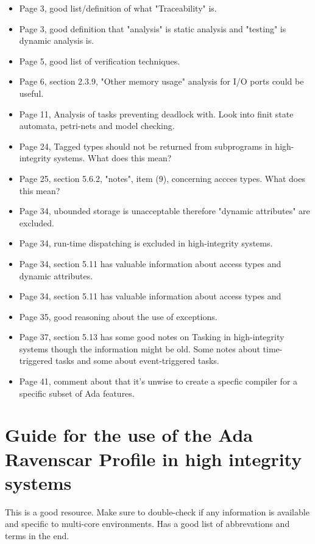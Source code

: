 \begin{itemize}
    \item Page 3, good list/definition of what "Traceability" is.
    \item Page 3, good definition that "analysis" is static analysis and
        "testing" is dynamic analysis is.
    \item Page 5, good list of verification techniques.
    \item Page 6, section 2.3.9, "Other memory usage" analysis for I/O ports
        could be useful.
    \item Page 11, Analysis of tasks preventing deadlock with. Look into finit
        state automata, petri-nets and model checking.
    \item Page 24, Tagged types should not be returned from subprograms in
        high-integrity systems. What does this mean?
    \item Page 25, section 5.6.2, "notes", item (9), concerning accces types.
        What does this mean?
    \item Page 34, ubounded storage is unacceptable therefore "dynamic
        attributes" are excluded.
    \item Page 34, run-time dispatching is excluded in high-integrity systems.
    \item Page 34, section 5.11 has valuable information about access types and
        dynamic attributes.
    \item Page 34, section 5.11 has valuable information about access types and
    \item Page 35, good reasoning about the use of exceptions.
    \item Page 37, section 5.13 has some good notes on Tasking in
        high-integrity systems though the information might be old. Some notes
        about time-triggered tasks and some about event-triggered tasks.
    \item Page 41, comment about that it's unwise to create a specfic compiler
        for a specific subset of Ada features.
\end{itemize}

\section{Guide for the use of the Ada Ravenscar Profile in high integrity
systems}

This is a good resource. Make sure to double-check if any information is
available and specific to multi-core environments. Has a good list of
abbrevations and terms in the end.


